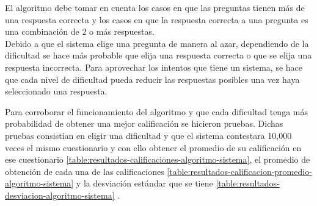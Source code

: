\clearpage
    El algoritmo debe tomar en cuenta los casos en que las preguntas tienen más de una respuesta correcta
    y los casos en que la respuesta correcta a una pregunta es una combinación de 2 o más respuestas.\\
\clearpage
    Debido a que el sistema elige una pregunta de manera al azar,
    dependiendo de la dificultad se hace más probable que elija una respuesta correcta o que se elija una respuesta incorrecta.
\clearpage
    Para aprovechar los intentos que tiene un sistema,
    se hace que cada nivel de dificultad pueda reducir las respuestas posibles una vez haya seleccionado una respuesta.
\clearpage


\noindent Para corroborar el funcionamiento del algoritmo y que cada dificultad tenga más probabilidad de obtener una mejor calificación se hicieron pruebas.
Dichas pruebas consistían en eligir una dificultad y que el sistema contestara 10,000 veces el mismo cuestionario y con ello obtener
el promedio de su calificación en ese cuestionario \ref{table:resultados-calificaciones-algoritmo-sistema}, 
el promedio de obtención de cada una de las calificaciones  \ref{table:resultados-calificacion-promedio-algoritmo-sistema}
y la desviación estándar que se tiene \ref{table:resultados-desviacion-algoritmo-sistema} .



